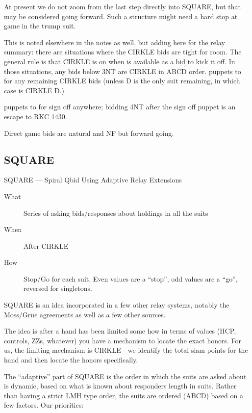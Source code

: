 \documentclass[tom-ari]{subfile}
\begin{document}
At present we do not zoom from the last step directly into SQUARE, but that may be considered going forward. Such a structure might need a hard stop at game in the trump suit.

This is noted elsewhere in the notes as well, but adding here for the relay summary: there are situations where the CIRKLE bids are tight for room.  The general rule is that CIRKLE is on when  is available as a bid to kick it off.  In those situations, any bids below 3NT are CIRKLE in ABCD order.  puppets to  for any remaining CIRKLE bids (unless D is the only suit remaining, in which case  is CIRKLE D.) 

 puppets to  for sign off anywhere; bidding 4NT after the sign off puppet is an escape to RKC 1430. 

Direct game bids are natural and NF but forward going.

\subsection{SQUARE}

SQUARE --- Spiral Qbid Using Adaptive Relay Extensions

\normalsize


\begin{description}
	\item[What] Series of asking bids/responses about holdings in all the suits
	\item[When] After CIRKLE
	\item[How] Stop/Go for each suit.  Even values are a ``stop'', odd values are a ``go'', reversed for singletons.  
\end{description}

SQUARE is an idea incorporated in a few other relay systems, notably the Moss/Grue agreements as well as a few other sources. 

The idea is after a hand has been limited some how in terms of values (HCP, controls, ZZs, whatever) you have a mechanism to locate the exact honors.  For us, the limiting mechanism is CIRKLE - we identify the total slam points for the hand and then locate the honors specifically.

The ``adaptive'' part of SQUARE is the order in which the suits are asked about is dynamic, based on what is known about responders length in suits.  Rather than having a strict LMH type order, the suits are ordered (ABCD) based on a few factors. Our priorities:
\end{document}
